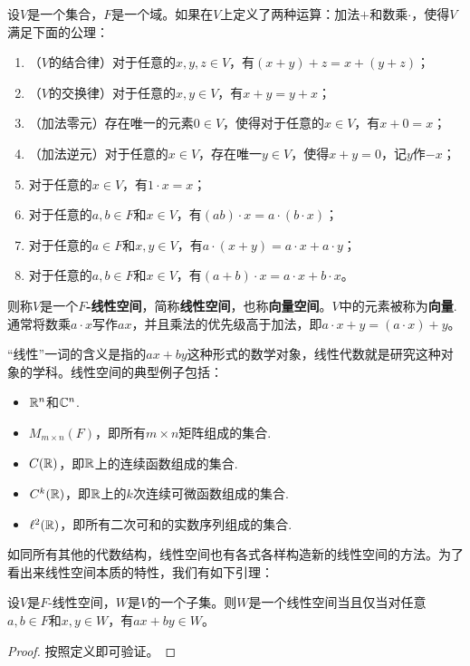 \begin{definition}
设$V$是一个集合，$F$是一个域。如果在$V$上定义了两种运算：加法$+$和数乘$\cdot$，使得$V$满足下面的公理：
\begin{enumerate}
    \item （$V$的结合律）对于任意的$x,y,z\in V$，有$(x+y)+z=x+(y+z)$；
    \item （$V$的交换律）对于任意的$x,y\in V$，有$x+y=y+x$；
    \item （加法零元）存在唯一的元素$0\in V$，使得对于任意的$x\in V$，有$x+0=x$；
    \item （加法逆元）对于任意的$x\in V$，存在唯一$y\in V$，使得$x+y=0$，记$y$作$-x$；
    \item 对于任意的$x\in V$，有$1\cdot x=x$；
    \item 对于任意的$a,b\in F$和$x\in V$，有$(ab)\cdot x=a\cdot (b\cdot x)$；
    \item 对于任意的$a\in F$和$x,y\in V$，有$a\cdot(x+y)=a\cdot x+a\cdot y$；
    \item 对于任意的$a,b\in F$和$x\in V$，有$(a+b)\cdot x=a\cdot x+b\cdot x$。
\end{enumerate}
则称$V$是一个\textbf{$F$-线性空间}，简称\textbf{线性空间}，也称\textbf{向量空间}。$V$中的元素被称为\textbf{向量}. 通常将数乘$a\cdot x$写作$ax$，并且乘法的优先级高于加法，即$a\cdot x+y=(a\cdot x)+y$。
\end{definition}

“线性”一词的含义是指的$ax+by$这种形式的数学对象，线性代数就是研究这种对象的学科。线性空间的典型例子包括：
\begin{itemize}
    \item $\mathbb{R}^n$和$\mathbb{C}^n$.
    \item $M_{m\times n}(F)$，即所有$m\times n$矩阵组成的集合.
    \item $C(\mathbb{R})$，即$\mathbb{R}$上的连续函数组成的集合.
    \item $C^k(\mathbb{R})$，即$\mathbb{R}$上的$k$次连续可微函数组成的集合.
    \item $\ell^2(\mathbb{R})$，即所有二次可和的实数序列组成的集合.
\end{itemize}

如同所有其他的代数结构，线性空间也有各式各样构造新的线性空间的方法。为了看出来线性空间本质的特性，我们有如下引理：

\begin{lemma}\label{lemma:linear-space-subspace}
设$V$是$F$-线性空间，$W$是$V$的一个子集。则$W$是一个线性空间当且仅当对任意$a,b\in F$和$x,y\in W$，有$ax+by\in W$。
\end{lemma}
\begin{proof}
    按照定义即可验证。
\end{proof}

